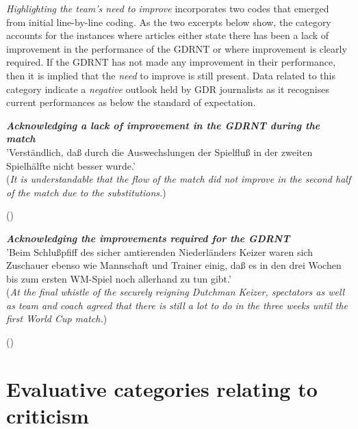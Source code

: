 \textit{Highlighting the team’s need to improve} incorporates two codes that emerged from initial line-by-line coding. As the two excerpts below show, the category accounts for the instances where articles either state there has been a lack of improvement in the performance of the GDRNT or where improvement is clearly required. If the GDRNT has not made any improvement in their performance, then it is implied that the \textit{need} to improve is still present. Data related to this category indicate a \textit{negative} outlook held by GDR journalists as it recognises current performances as below the standard of expectation.

\begin{displayquote}
\begin{small}
\textbf{\textit{Acknowledging a lack of improvement in the GDRNT during the match}}\\
'Verständlich, daß durch die Auswechslungen der Spielfluß in der zweiten Spielhälfte nicht besser wurde.'\\
(\textit{It is understandable that the flow of the match did not improve in the second half of the match due to the substitutions.})\
\begin{flushright}\footnotesize (\cite{nd19740328})\end{flushright}
\end{small}
\end{displayquote}

\begin{displayquote}
\begin{small}
\textbf{\textit{Acknowledging the improvements required for the GDRNT}}\\
'Beim Schlußpfiff des sicher amtierenden Niederländers Keizer waren sich Zuschauer ebenso wie Mannschaft und Trainer einig, daß es in den drei Wochen bis zum ersten WM-Spiel noch allerhand zu tun gibt.'\\
(\textit{At the final whistle of the securely reigning Dutchman Keizer, spectators as well as team and coach agreed that there is still a lot to do in the three weeks until the first World Cup match.})\
\begin{flushright}\footnotesize (\cite{nd19740524})\end{flushright}
\end{small}
\end{displayquote}

\section*{Evaluative categories relating to criticism}

